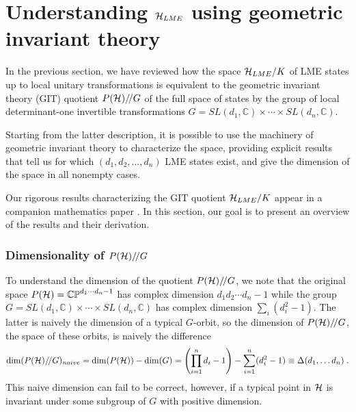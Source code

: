 \documentclass[12pt]{article}
\theoremstyle{definition}
\newcommand{\be}{\begin{equation}}
\newcommand{\ee}{\end{equation}}
\newcommand{\GITquot}{/\!/}
\begin{document}
\section{Understanding ${\cal H}_{LME}$ using geometric invariant theory}

In the previous section, we have reviewed how the space ${\cal H}_{LME}/K$ of LME states up to local unitary transformations is equivalent to the geometric invariant theory (GIT) quotient $P({\cal H})\GITquot G$ of the full space of states by the group of local determinant-one invertible transformations $G = SL(d_1,\mathbb{C}) \times \cdots \times SL(d_n,\mathbb{C})$. 

Starting from the latter description, it is possible to use the machinery of geometric invariant theory to characterize the space, providing explicit results that tell us for which $(d_1, d_2, \dots, d_n)$ LME states exist, and give the dimension of the space in all nonempty cases. 

Our rigorous results characterizing the GIT quotient ${\cal H}_{LME}/K$ appear in a companion mathematics paper \cite{mathpaper}. In this section, our goal is to present an overview of the results and their derivation.

\subsubsection*{Dimensionality of $P({\cal H})\GITquot G$}

To understand the dimension of the quotient $P({\cal H})\GITquot G$, we note that the original space $P({\cal H}) = \mathbb{CP}^{d_1 \cdots d_n -1}$ has complex dimension $d_1 d_2 \cdots d_n - 1$ while the group $G = SL(d_1, \mathbb{C}) \times \cdots \times SL(d_n, \mathbb{C})$ has complex dimension $\sum_i (d_i^2 -1)$. The latter is naively the dimension of a typical $G$-orbit, so the dimension of $P({\cal H})\GITquot G$, the space of these orbits, is naively the difference
\be
\label{defDel1}
{\rm dim}(P({\cal H})\GITquot G)_{naive} = {\rm dim}(P({\cal H})) - {\rm dim}(G) = \left(\prod_{i=1}^n d_i - 1 \right) - \sum_{i=1}^n( d_i^2 -1) \equiv \Delta(d_1, \dots d_n)\; .
\ee
This naive dimension can fail to be correct, however, if a typical point in ${\cal H}$ is invariant under some subgroup of $G$ with positive dimension.
\end{document}
